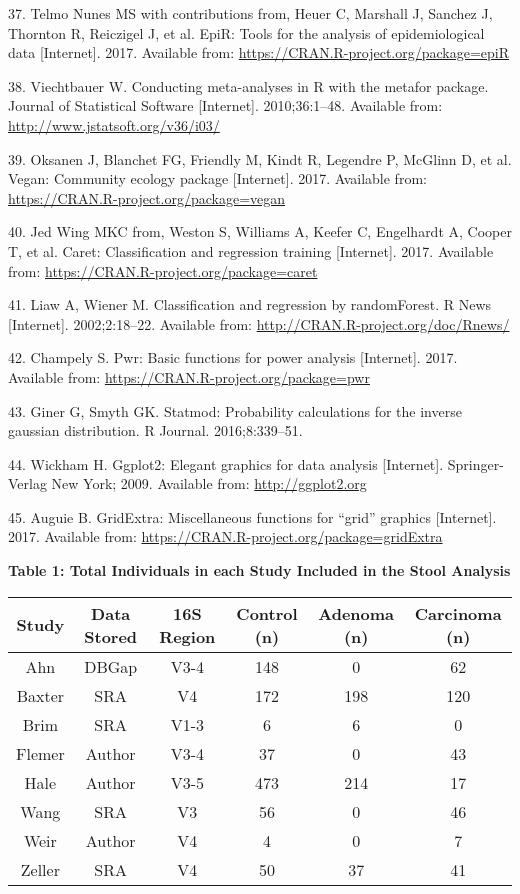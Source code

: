 \documentclass[12pt,]{article}
\begin{document}
\hypertarget{ref-epir_citation_2017}{}
37. Telmo Nunes MS with contributions from, Heuer C, Marshall J, Sanchez
J, Thornton R, Reiczigel J, et al. EpiR: Tools for the analysis of
epidemiological data {[}Internet{]}. 2017. Available from:
\url{https://CRAN.R-project.org/package=epiR}

\hypertarget{ref-metafor_citation_2010}{}
38. Viechtbauer W. Conducting meta-analyses in R with the metafor
package. Journal of Statistical Software {[}Internet{]}. 2010;36:1--48.
Available from: \url{http://www.jstatsoft.org/v36/i03/}

\hypertarget{ref-vegan_citation_2017}{}
39. Oksanen J, Blanchet FG, Friendly M, Kindt R, Legendre P, McGlinn D,
et al. Vegan: Community ecology package {[}Internet{]}. 2017. Available
from: \url{https://CRAN.R-project.org/package=vegan}

\hypertarget{ref-caret_citation_2017}{}
40. Jed Wing MKC from, Weston S, Williams A, Keefer C, Engelhardt A,
Cooper T, et al. Caret: Classification and regression training
{[}Internet{]}. 2017. Available from:
\url{https://CRAN.R-project.org/package=caret}

\hypertarget{ref-randomforest_citation_2002}{}
41. Liaw A, Wiener M. Classification and regression by randomForest. R
News {[}Internet{]}. 2002;2:18--22. Available from:
\url{http://CRAN.R-project.org/doc/Rnews/}

\hypertarget{ref-pwr_citation_2017}{}
42. Champely S. Pwr: Basic functions for power analysis {[}Internet{]}.
2017. Available from: \url{https://CRAN.R-project.org/package=pwr}

\hypertarget{ref-statmod_citation_2016}{}
43. Giner G, Smyth GK. Statmod: Probability calculations for the inverse
gaussian distribution. R Journal. 2016;8:339--51.

\hypertarget{ref-ggplot2_citation_2009}{}
44. Wickham H. Ggplot2: Elegant graphics for data analysis
{[}Internet{]}. Springer-Verlag New York; 2009. Available from:
\url{http://ggplot2.org}

\hypertarget{ref-gridextra_citation_2017}{}
45. Auguie B. GridExtra: Miscellaneous functions for ``grid'' graphics
{[}Internet{]}. 2017. Available from:
\url{https://CRAN.R-project.org/package=gridExtra}

\newpage

\textbf{Table 1: Total Individuals in each Study Included in the Stool
Analysis}

\footnotesize

\begin{longtable}[]{@{}cccccc@{}}
\toprule
Study & Data Stored & 16S Region & Control (n) & Adenoma (n) & Carcinoma
(n)\tabularnewline
\midrule
\endhead
Ahn & DBGap & V3-4 & 148 & 0 & 62\tabularnewline
Baxter & SRA & V4 & 172 & 198 & 120\tabularnewline
Brim & SRA & V1-3 & 6 & 6 & 0\tabularnewline
Flemer & Author & V3-4 & 37 & 0 & 43\tabularnewline
Hale & Author & V3-5 & 473 & 214 & 17\tabularnewline
Wang & SRA & V3 & 56 & 0 & 46\tabularnewline
Weir & Author & V4 & 4 & 0 & 7\tabularnewline
Zeller & SRA & V4 & 50 & 37 & 41\tabularnewline
\bottomrule
\end{longtable}
\end{document}
